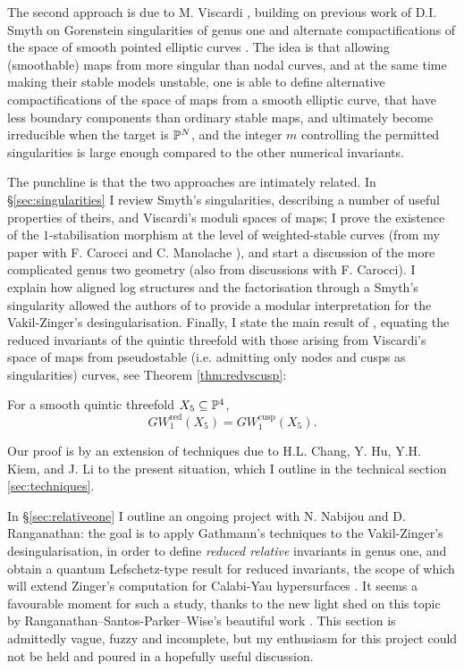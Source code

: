 The second approach is due to M. Viscardi \cite{VISC}, building on previous work of D.I. Smyth on Gorenstein singularities of genus one and alternate compactifications of the space of smooth pointed elliptic curves \cite{SMY1}. The idea is that allowing (smoothable) maps from more singular than nodal curves, and at the same time making their stable models unstable, one is able to define alternative compactifications of the space of maps from a smooth elliptic curve, that have less boundary components than ordinary stable maps, and ultimately become irreducible when the target is $\mathbb P^N$, and the integer $m$ controlling the permitted singularities is large enough compared to the other numerical invariants.

The punchline is that the two approaches are intimately related. In \S \ref{sec:singularities} I review Smyth's singularities, describing a number of useful properties of theirs, and Viscardi's moduli spaces of maps; I prove the existence of the $1$-stabilisation morphism at the level of weighted-stable curves (from my paper with F. Carocci and C. Manolache \cite{BCM}), and start a discussion of the more complicated genus two geometry (also from discussions with F. Carocci). I explain how aligned log structures and the factorisation through a Smyth's singularity allowed the authors of \cite{RSPW} to provide a modular interpretation for the Vakil-Zinger's desingularisation. Finally, I state the main result of \cite{BCM}, equating the reduced invariants of the quintic threefold with those arising from Viscardi's space of maps from pseudostable \cite{Schubert} (i.e. admitting only nodes and cusps as singularities) curves, see Theorem \ref{thm:redvscusp}:
\begin{thm*}
 For a smooth quintic threefold $X_5\subseteq \mathbb P^4$, \[GW_1^{\mathrm{red}}(X_5)=GW_1^{\mathrm{cusp}}(X_5).\]
\end{thm*}
Our proof is by an extension of techniques due to H.L. Chang, Y. Hu, Y.H. Kiem, and J. Li to the present situation, which I outline in the technical section \ref{sec:techniques}.

In \S \ref{sec:relativeone} I outline an ongoing project with N. Nabijou and D. Ranganathan: the goal is to apply Gathmann's techniques to the Vakil-Zinger's desingularisation, in order to define \emph{reduced relative} invariants in genus one, and obtain a quantum Lefschetz-type result for reduced invariants, the scope of which will extend Zinger's computation for Calabi-Yau hypersurfaces \cite{Zinger-CYhyp}. It seems a favourable moment for such a study, thanks to the new light shed on this topic by Ranganathan--Santos-Parker--Wise's beautiful work \cites{RSPW,RSPW2}. This section is admittedly vague, fuzzy and incomplete, but my enthusiasm for this project could not be held and poured in a hopefully useful discussion.

